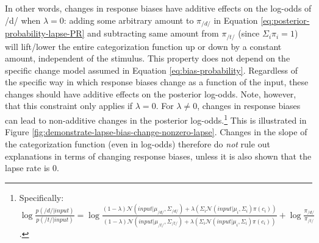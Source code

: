 \documentclass[
  11pt,
  man,floatsintext]{apa6}
\begin{document}
In other words, changes in response biases have additive effects on the log-odds of /d/ when \(\lambda = 0\): adding some arbitrary amount to \(\pi_{/d/}\) in Equation \eqref{eq:posterior-probability-lapse-PR} and subtracting same amount from \(\pi_{/t/}\) (since \(\Sigma_i \pi_i = 1\)) will lift/lower the entire categorization function up or down by a constant amount, independent of the stimulus. This property does not depend on the specific change model assumed in Equation \eqref{eq:bias-probability}. Regardless of the specific way in which response biases change as a function of the input, these changes should have additive effects on the posterior log-odds.
Note, however, that this constraint only applies if \(\lambda = 0\). For \(\lambda \neq 0\), changes in response biases can lead to non-additive changes in the posterior log-odds.\footnote{Specifically: \(\log \frac{p(/d/ | input)}{p(/t/ | input)} = \log \frac{(1-\lambda)\mathcal{N}\!\left( input | \mu_{/d/}, \Sigma_{/d/} \right) + \lambda \left(\Sigma_i \mathcal{N}\!\left( input | \mu_{i}, \Sigma_{i} \right)\pi(c_i)\right)}{(1-\lambda)\mathcal{N}\!\left( input | \mu_{/t/}, \Sigma_{/t/} \right) + \lambda \left(\Sigma_i \mathcal{N}\!\left( input | \mu_{i}, \Sigma_{i} \right)\pi(c_i)\right)} + \log\frac{\pi_{/d/}}{\pi_{/t/}}\).} This is illustrated in Figure \ref{fig:demonstrate-lapse-bias-change-nonzero-lapse}. Changes in the slope of the categorization function (even in log-odds) therefore do \emph{not} rule out explanations in terms of changing response biases, unless it is also shown that the lapse rate is 0.
\end{document}
